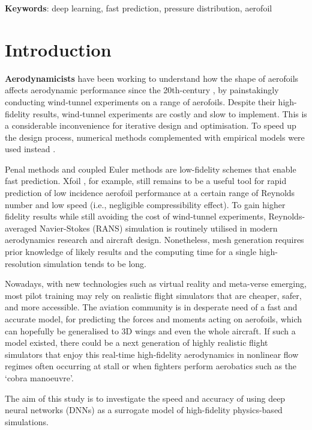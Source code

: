 \documentclass[11pt]{article}
\begin{document}
\begin{center}
	\textbf{Keywords}: deep learning, fast prediction, pressure distribution, aerofoil
\end{center}

\section{Introduction}
\textbf {Aerodynamicists}
 have been working to understand how the shape of aerofoils affects aerodynamic performance since the 20th-century \cite {A.D.Y.1950TheoryIndex.}, by painstakingly conducting wind-tunnel experiments on a range of aerofoils. Despite their high-fidelity results, wind-tunnel experiments are costly and slow to implement. This is a considerable inconvenience for iterative design and optimisation. To speed up the design process, numerical methods complemented with empirical models were used instead \cite {Drela1987Viscous-inviscidAirfoils}.
 
Penal methods and coupled Euler methods are low-fidelity schemes that enable fast prediction. Xfoil \cite {Drela1989XFOIL:Airfoils.}, for example, still remains to be a useful tool for rapid prediction of low incidence aerofoil performance at a certain range of Reynolds number and low speed (i.e., negligible compressibility effect). To gain higher fidelity results while still avoiding the cost of wind-tunnel experiments, Reynolds-averaged Navier-Stokes (RANS) simulation is routinely utilised in modern aerodynamics research and aircraft design. Nonetheless, mesh generation requires prior knowledge of likely results and the computing time for a single high-resolution simulation tends to be long.

Nowadays, with new technologies such as virtual reality and meta-verse emerging, most pilot training may rely on realistic flight simulators that are cheaper, safer, and more accessible. The aviation community is in desperate need of a fast and accurate model, for predicting the forces and moments acting on aerofoils, which can hopefully be generalised to 3D wings and even the whole aircraft. If such a model existed, there could be a next generation of highly realistic flight simulators that enjoy this real-time high-fidelity aerodynamics in nonlinear flow regimes often occurring at stall or when fighters perform aerobatics such as the ‘cobra manoeuvre’.

The aim of this study is to investigate the speed and accuracy of using deep neural networks (DNNs) as a surrogate model of high-fidelity physics-based simulations.
\end{document}
